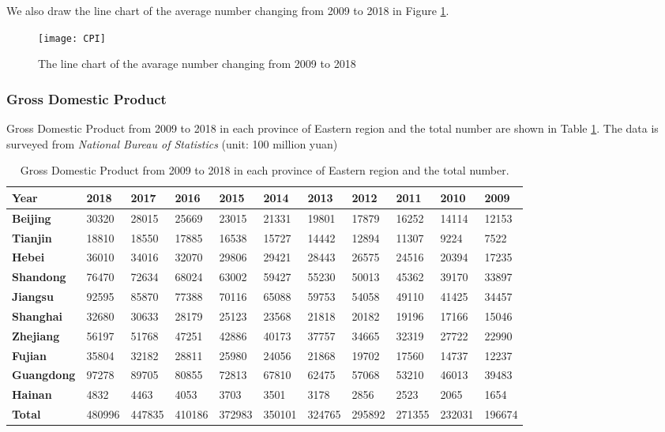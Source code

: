 \documentclass{apmcmthesis}
\begin{document}
We also draw the line chart of the average number changing from 2009 to 2018 in Figure \ref{CPI}.
\begin{figure}[h]
  \centering
  \texttt{[image: CPI]}
  \caption{The line chart of the avarage number changing from 2009 to 2018}\label{CPI}
\end{figure}
\subsubsection{Gross Domestic Product}
\hspace{2em}Gross Domestic Product from 2009 to 2018 in each province of Eastern region and the total number are shown in Table \ref{tabel5}. The data is surveyed from \textit{National Bureau of Statistics} (unit: 100 million yuan)
\begin{table}[h]
\scriptsize
\centering
\caption{Gross Domestic Product from 2009 to 2018 in each province of Eastern region and the total number.} 
\begin{tabular}{p{1cm}<{\centering}p{1cm}<{\centering}p{1cm}<{\centering}p{1cm}<{\centering}p{1cm}<{\centering}p{1cm}<{\centering}p{1cm}<{\centering}p{1cm}<{\centering}p{1cm}<{\centering}p{1cm}<{\centering}p{1cm}<{\centering}}
\toprule
  \textbf{Year} &\textbf{2018} & \textbf{2017} & \textbf{2016} & \textbf{2015} & \textbf{2014} & \textbf{2013} & \textbf{2012} & \textbf{2011} & \textbf{2010} & \textbf{2009}  \\
\midrule
   \textbf{Beijing} & 30320 & 28015 & 25669 & 23015 & 21331 & 19801 & 17879 & 16252 & 14114 & 12153 \\
   \textbf{Tianjin} & 18810 & 18550 & 17885 & 16538 & 15727 & 14442 & 12894 & 11307 & 9224 & 7522 \\
   \textbf{Hebei}   & 36010 & 34016 & 32070 & 29806 & 29421 & 28443 & 26575 & 24516 & 20394 & 17235   \\
   \textbf{Shandong}& 76470 & 72634 & 68024 & 63002 & 59427 & 55230 & 50013 & 45362 & 39170 & 33897 \\
   \textbf{Jiangsu} & 92595 & 85870 & 77388 & 70116 & 65088 & 59753 & 54058 & 49110 & 41425 & 34457    \\
   \textbf{Shanghai}& 32680 & 30633 & 28179 & 25123 & 23568 & 21818 & 20182 & 19196 & 17166 & 15046 \\
   \textbf{Zhejiang}& 56197 & 51768 & 47251 & 42886 & 40173 & 37757 & 34665 & 32319 & 27722 & 22990 \\
   \textbf{Fujian}  & 35804 & 32182 & 28811 & 25980 & 24056 & 21868 & 19702 & 17560 & 14737 & 12237   \\
   \textbf{Guangdong}& 97278 & 89705 & 80855 & 72813 & 67810 & 62475 & 57068 & 53210 & 46013 & 39483   \\
   \textbf{Hainan}  & 4832 & 4463 & 4053 & 3703 & 3501 & 3178 & 2856 & 2523 & 2065 & 1654   \\
   \textbf{Total} & 480996  & 447835  & 410186  & 372983 & 350101  & 324765  & 295892  & 271355  & 232031  & 196674\\
\bottomrule
\end{tabular}\label{tabel5}
\end{table}
\end{document}
